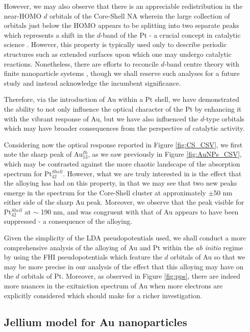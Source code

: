 However, we may also observe that there is an appreciable redistribution in the near-HOMO $d$ orbitals of the Core-Shell NA wherein the large collection of orbitals just below the HOMO appears to be splitting into two separate peaks which represents a shift in the $d$-band of the Pt - a crucial concept in catalytic science \cite{Nrskov2011,Nrskov2009,Ruban1997}. However, this property is typically used only to describe periodic structures such as extended surfaces upon which one may undergo catalytic reactions. Nonetheless, there are efforts to reconcile $d$-band centre theory with finite nanoparticle systems \cite{Gorzkowski2015}, though we shall reserve such analyses for a future study and instead acknowledge the incumbent significance. 

Therefore, via the introduction of Au within a Pt shell, we have demonstrated the ability to not only influence the optical character of the Pt by enhancing it with the vibrant response of Au, but we have also influenced the $d$-type orbitals which may have broader consequences from the perspective of catalytic activity. 

Considering now the optical response reported in Figure \ref{fig:CS_CSV}, we first note the sharp peak of Au$_{13}^{Ih}$, as we saw previously in Figure \ref{fig:AuNPs_CSV}, which may be contrasted against the more chaotic landscape of the absorption spectrum for Pt$_{42}^{Shell}$. However, what we are truly interested in is the effect that the alloying has had on this property, in that we may see that two new peaks emerge in the spectrum for the Core-Shell cluster at approximately $\pm$50 nm either side of the sharp Au peak. Moreover, we observe that the peak visible for Pt$_{42}^{Shell}$ at $\sim$ 190 nm, and was congruent with that of Au appears to have been suppressed -  a consequence of the alloying.

Given the simplicity of the LDA pseudopotentials used, we shall conduct a more comprehensive analysis of the alloying of Au and Pt within the \textit{ab initio} regime by using the FHI pseudopotentials which feature the $d$ orbitals of Au so that we may be more precise in our analysis of the effect that this alloying may have on the $d$ orbitals of Pt. Moreover, as observed in Figure \ref{fig:pps}, there are indeed more nuances in the exitniction spectrum of Au when more electrons are explicitly considered which should make for a richer investigation.

\subsection{Jellium model for Au nanoparticles}
\label{sec:Res_JLM}

